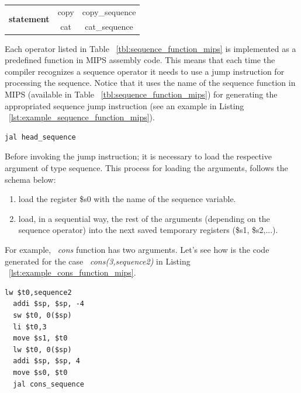 \documentclass[
  oneside,
  11pt, a4paper,
  footinclude=true,
  headinclude=true,
  cleardoublepage=empty
]{scrbook}
\begin{document}
\begin{table}[h!]
\begin{tabular}{|c|c|c|}
\multirow{2}{*}{\textbf{statement}}  & copy                                                                                      & copy\_sequence                                                                            \\ \cline{2-3} 
                                     & cat                                                                                       & cat\_sequence                                                                             \\ \hline
\end{tabular}
\end{table}

Each operator listed in Table ~\ref{tbl:sequence_function_mips} is implemented as a predefined function in MIPS assembly code. This means that each time the compiler recognizes a sequence operator it needs to use a jump instruction for processing the sequence. Notice that it uses the name of the sequence function in MIPS (available in Table ~\ref{tbl:sequence_function_mips}) for generating the appropriated sequence jump instruction (see an example in Listing ~\ref{lst:example_sequence_function_mips}).

\begin{lstlisting}[caption={Example of processing a head function in MIPS},label={lst:example_sequence_function_mips}]
  jal head_sequence
\end{lstlisting}

Before invoking the jump instruction; it is necessary to load the respective argument of type sequence. This process for loading the arguments, follows the schema below:

\begin{enumerate}
\item load the register \$s0 with the name of the sequence variable.
\item load, in a sequential way, the rest of the arguments (depending on the sequence operator) into the next saved temporary registers (\$s1, \$s2,...).
\end{enumerate}

For example, ~\textit{cons} function has two arguments. Let's see how is the code generated for the case ~\textit{cons(3,sequence2)} in Listing ~\ref{lst:example_cons_function_mips}.

\begin{lstlisting}[caption={Example of a code generated for the function ~\textit{cons}},label={lst:example_cons_function_mips}]
  lw $t0,sequence2	
  addi $sp, $sp, -4
  sw $t0, 0($sp)
  li $t0,3		
  move $s1, $t0		
  lw $t0, 0($sp)
  addi $sp, $sp, 4
  move $s0, $t0		
  jal cons_sequence
\end{lstlisting}
\end{document}
